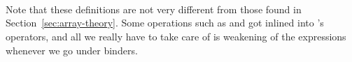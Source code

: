 \begin{code}
%
\\[\AgdaEmptyExtraSkip]%
%
\>[2]\AgdaSpace{}%
\AgdaSymbol{:}\AgdaSpace{}%
\AgdaSpace{}%
\AgdaSpace{}%
\AgdaSpace{}%
\AgdaSpace{}%
\AgdaSymbol{(}\AgdaSpace{}%
\AgdaSymbol{:}\AgdaSpace{}%
\AgdaSpace{}%
\AgdaSpace{}%
\AgdaSymbol{(}\AgdaSpace{}%
\AgdaSymbol{(}\AgdaSpace{}%
\AgdaSymbol{(}\AgdaSpace{}%
\AgdaSpace{}%
\AgdaSymbol{)}\AgdaSpace{}%
\AgdaSpace{}%
\AgdaSpace{}%
\AgdaSymbol{(}\AgdaSpace{}%
\AgdaSpace{}%
\AgdaSymbol{))))}\AgdaSpace{}%
\AgdaSpace{}%
\AgdaSpace{}%
\AgdaSpace{}%
\AgdaSymbol{(}\AgdaSpace{}%
\AgdaSymbol{(}\AgdaSpace{}%
\AgdaSpace{}%
\AgdaSpace{}%
\AgdaSpace{}%
\AgdaSymbol{))}\<%
\\
%
\>[2]\AgdaSpace{}%
\AgdaSpace{}%
\AgdaSpace{}%
\AgdaSpace{}%
\AgdaSymbol{=}\AgdaSpace{}%
\AgdaSpace{}%
\AgdaSpace{}%
\AgdaSpace{}%
\AgdaSpace{}%
\AgdaSpace{}%
\AgdaSpace{}%
\AgdaOperator{\AgdaFunction{\$}}\AgdaSpace{}%
\AgdaSpace{}%
\AgdaSpace{}%
\AgdaSpace{}%
\AgdaSpace{}%
\AgdaSpace{}%
\AgdaSymbol{(}\AgdaSpace{}%
\AgdaSymbol{(}\AgdaSpace{}%
\AgdaSpace{}%
\AgdaSymbol{)}\AgdaSpace{}%
\AgdaSymbol{(}\AgdaSpace{}%
\AgdaSymbol{)}\AgdaSpace{}%
\AgdaSymbol{(}\AgdaSpace{}%
\AgdaSymbol{))}\AgdaSpace{}%
\<%
\\
\>[0]\<%
\end{code}
Note that these definitions are not very different from those found in
Section~\ref{sec:array-theory}.  Some operations such as  and 
got inlined into 's operators, and all we really have to take care of is 
weakening of the expressions whenever we go under binders.

